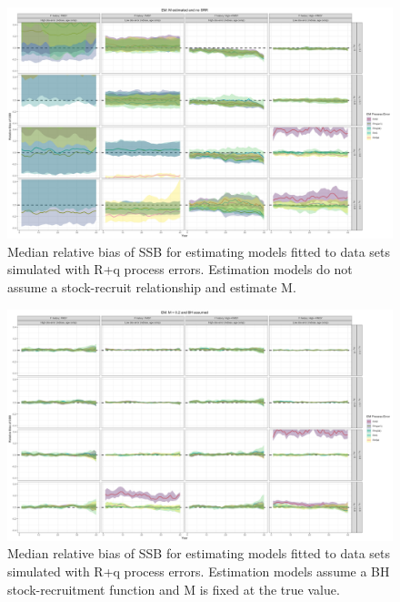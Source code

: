 \documentclass[
  12pt,
]{article}
\begin{document}
\begin{landscape}
\begin{figure}
\caption{Median relative bias of SSB for estimating models fitted to data sets simulated with R+q process errors. Estimation models do not assume a stock-recruit relationship and estimate M.}\label{q_om_em_R_ME_relbias_ssb}
\begin{center}
\includegraphics[width = \textwidth]{q_om_R_ME_relbias_ssb.png}
\end{center}
\end{figure}
\end{landscape}

\begin{landscape}
\begin{figure}
\caption{Median relative bias of SSB for estimating models fitted to data sets simulated with R+q process errors. Estimation models assume a BH stock-recruitment function and M is fixed at the true value.}\label{q_om_em_BH_MF_relbias_ssb}
\begin{center}
\includegraphics[width = \textwidth]{q_om_BH_MF_relbias_ssb.png}
\end{center}
\end{figure}
\end{landscape}
\end{document}
